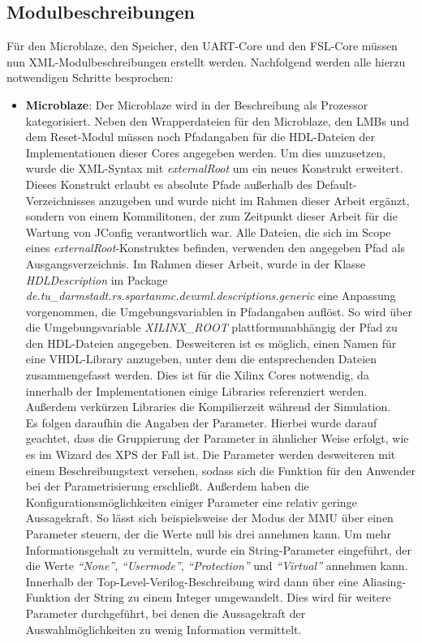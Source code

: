 \subsection{Modulbeschreibungen}
Für den Microblaze, den Speicher, den UART-Core und den FSL-Core müssen nun XML-Modulbeschreibungen erstellt werden. Nachfolgend werden alle hierzu notwendigen Schritte besprochen:
\begin{itemize}
\item \textbf{Microblaze}: Der Microblaze wird in der Beschreibung als Prozessor kategorisiert. Neben den Wrapperdateien für den Microblaze, den LMBs und dem Reset-Modul müssen noch Pfadangaben für die HDL-Dateien der Implementationen dieser Cores angegeben werden. Um dies umzusetzen, wurde die XML-Syntax mit \textit{externalRoot} um ein neues Konstrukt erweitert. Dieses Konstrukt erlaubt es absolute Pfade außerhalb des Default-Verzeichnisses anzugeben und wurde nicht im Rahmen dieser Arbeit ergänzt, sondern von einem Kommilitonen, der zum Zeitpunkt dieser Arbeit für die Wartung von JConfig verantwortlich war. Alle Dateien, die sich im Scope eines \textit{externalRoot}-Konstruktes befinden, verwenden den angegeben Pfad als Ausgangsverzeichnis. Im Rahmen dieser Arbeit, wurde in der Klasse \textit{HDLDescription} im Package \textit{de.tu\_darmstadt.rs.spartanmc.devxml.descriptions.generic} eine Anpassung vorgenommen, die Umgebungsvariablen in Pfadangaben auflöst. So wird über die Umgebungsvariable \textit{XILINX\_ROOT} plattformunabhängig der Pfad zu den HDL-Dateien angegeben. Desweiteren ist es möglich, einen Namen für eine VHDL-Library anzugeben, unter dem die entsprechenden Dateien zusammengefasst werden. Dies ist für die Xilinx Cores notwendig, da innerhalb der Implementationen einige Libraries referenziert werden. Außerdem verkürzen Libraries die Kompilierzeit während der Simulation.\\
Es folgen daraufhin die Angaben der Parameter. Hierbei wurde darauf geachtet, dass die Gruppierung der Parameter in ähnlicher Weise erfolgt, wie es im Wizard des XPS der Fall ist. Die Parameter werden desweiteren mit einem Beschreibungstext versehen, sodass sich die Funktion für den Anwender bei der Parametrisierung erschließt. Außerdem haben die Konfigurationsmöglichkeiten einiger Parameter eine relativ geringe Aussagekraft. So lässt sich beispielsweise der Modus der MMU über einen Parameter steuern, der die Werte null bis drei annehmen kann. Um mehr Informationsgehalt zu vermitteln, wurde ein String-Parameter eingeführt, der die Werte \textit{``None''}, \textit{``Usermode''}, \textit{``Protection''} und \textit{``Virtual''} annehmen kann. Innerhalb der Top-Level-Verilog-Beschreibung wird dann über eine Aliasing-Funktion der String zu einem Integer umgewandelt. Dies wird für weitere Parameter durchgeführt, bei denen die Aussagekraft der Auswahlmöglichkeiten zu wenig Information vermittelt.\\

\end{itemize}
